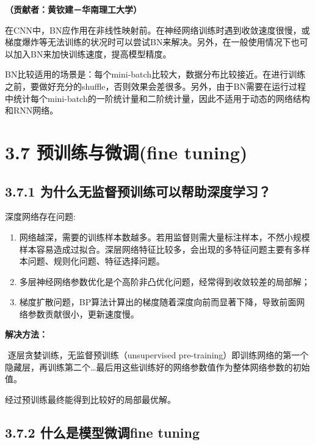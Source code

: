 \textbf{（贡献者：黄钦建－华南理工大学）}

​
在CNN中，BN应作用在非线性映射前。在神经网络训练时遇到收敛速度很慢，或梯度爆炸等无法训练的状况时可以尝试BN来解决。另外，在一般使用情况下也可以加入BN来加快训练速度，提高模型精度。

​
BN比较适用的场景是：每个mini-batch比较大，数据分布比较接近。在进行训练之前，要做好充分的shuffle，否则效果会差很多。另外，由于BN需要在运行过程中统计每个mini-batch的一阶统计量和二阶统计量，因此不适用于动态的网络结构和RNN网络。

\section{3.7 预训练与微调(fine
tuning)}\label{ux9884ux8badux7ec3ux4e0eux5faeux8c03fine-tuning}

\subsection{3.7.1
为什么无监督预训练可以帮助深度学习？}\label{ux4e3aux4ec0ux4e48ux65e0ux76d1ux7763ux9884ux8badux7ec3ux53efux4ee5ux5e2eux52a9ux6df1ux5ea6ux5b66ux4e60}

深度网络存在问题:

\begin{enumerate}
\def\labelenumi{\arabic{enumi}.}
\item
  网络越深，需要的训练样本数越多。若用监督则需大量标注样本，不然小规模样本容易造成过拟合。深层网络特征比较多，会出现的多特征问题主要有多样本问题、规则化问题、特征选择问题。
\item
  多层神经网络参数优化是个高阶非凸优化问题，经常得到收敛较差的局部解；
\item
  梯度扩散问题，BP算法计算出的梯度随着深度向前而显著下降，导致前面网络参数贡献很小，更新速度慢。
\end{enumerate}

\textbf{解决方法：}

​ 逐层贪婪训练，无监督预训练（unsupervised
pre-training）即训练网络的第一个隐藏层，再训练第二个\ldots{}最后用这些训练好的网络参数值作为整体网络参数的初始值。

经过预训练最终能得到比较好的局部最优解。

\subsection{3.7.2 什么是模型微调fine
tuning}\label{ux4ec0ux4e48ux662fux6a21ux578bux5faeux8c03fine-tuning}

